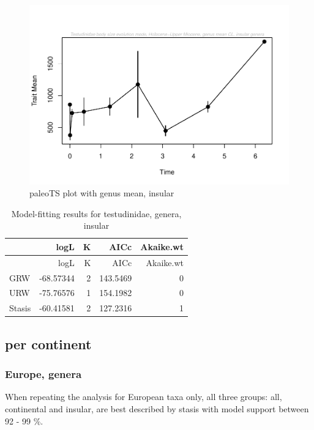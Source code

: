 \begin{figure}[H]
	\centering
	\includegraphics{MA_JJ_files/figure-latex/paleoTSI-1.pdf}
	\caption{paleoTS plot with genus mean, insular}
	\label{fig:pTSI}
\end{figure}

\begin{longtable}[]{@{}lrrrr@{}}
	\caption{Model-fitting results for testudinidae, genera,
		insular}
	\label{tab:pTSIEM}\tabularnewline
	\toprule
	& logL & K & AICc & Akaike.wt\tabularnewline
	\midrule
	\endfirsthead
	\toprule
	& logL & K & AICc & Akaike.wt\tabularnewline
	\midrule
	\endhead
	GRW & -68.57344 & 2 & 143.5469 & 0\tabularnewline
	URW & -75.76576 & 1 & 154.1982 & 0\tabularnewline
	Stasis & -60.41581 & 2 & 127.2316 & 1\tabularnewline
	\bottomrule
\end{longtable}

\FloatBarrier

\subsection{per continent}\label{per-continent}

\subsubsection{Europe, genera}\label{europe-genera}

When repeating the analysis for European taxa only, all three groups: all, continental and insular, are best described by stasis with model support between 92 - 99 \%.

